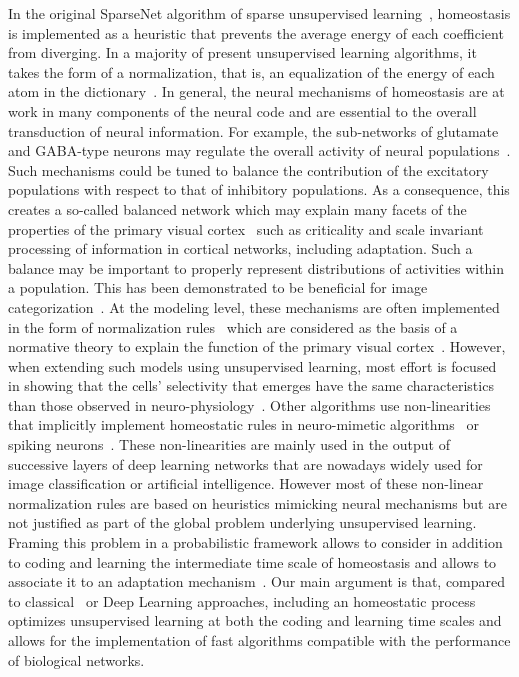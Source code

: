 \documentclass[vision,article,submit,oneauthor,pdftex]{Definitions/mdpi}
\begin{document}
In the original {\sc SparseNet} algorithm of sparse unsupervised learning~\citep{Olshausen97}, homeostasis is implemented as a heuristic that prevents the average energy of each coefficient from diverging. In a majority of present unsupervised learning algorithms, it takes the form of a normalization, that is, an equalization of the energy of each atom in the dictionary~\citep{Mairal14}.
In general, the neural mechanisms of homeostasis are at work in many components of the neural code and are essential to the overall transduction of neural information. For example, the sub-networks of glutamate and GABA-type neurons may regulate the overall activity of neural populations~\citep{Marder2006variability}. Such mechanisms could be tuned to balance the contribution of the excitatory populations with respect to that of inhibitory populations. As a consequence, this creates a so-called balanced network which may explain many facets of the properties of the primary visual cortex~\citep{Hansel12} such as criticality and scale invariant processing of information in cortical networks, including adaptation. Such a balance may be important to properly represent distributions of activities within a population. This has been demonstrated to be beneficial for image categorization~\citep{PerrinetBednar15}. At the modeling level, these mechanisms are often implemented in the form of normalization rules~\citep{Schwartz01} which are considered as the basis of a normative theory to explain the function of the primary visual cortex~\citep{Carandini12}. However, when extending such models using unsupervised learning, most effort is focused in showing that the cells' selectivity that emerges have the same characteristics than those observed in neuro-physiology~\citep{Ringach02,Rehn07,Loxley17}. Other algorithms use non-linearities that implicitly implement homeostatic rules in neuro-mimetic algorithms~\citep{Brito16} or spiking neurons~\citep{Perrinet03}. These non-linearities are mainly used in the output of successive layers of deep learning networks that are nowadays widely used for image classification or artificial intelligence. However most of these non-linear normalization rules are based on heuristics mimicking neural mechanisms but are not justified as part of the global problem underlying unsupervised learning. Framing this problem in a probabilistic framework allows to consider in addition to coding and learning the intermediate time scale of homeostasis and allows to associate it to an adaptation mechanism~\citep{Rao99}. Our main argument is that, compared to classical~\citep{Olshausen97} or Deep Learning approaches, including an homeostatic process optimizes unsupervised learning at both the coding and learning time scales and allows for the implementation of fast algorithms compatible with the performance of biological networks. %
\end{document}
